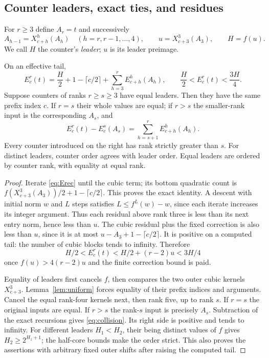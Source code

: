 \documentclass[11pt]{article}
\begin{document}
\subsection{Counter leaders, exact ties, and residues}
For $r\ge3$ define $A_r=t$ and successively
\[
 A_{h-1}=X^h_{c+h}(A_h)\quad(h=r,r-1,\ldots,4),\qquad
 u=X^3_{c+3}(A_3),\qquad H=f(u).
\]
We call $H$ the counter's \emph{leader}; $u$ is its leader preimage.

\begin{lemma}\label{lem:counter}
On an effective tail,
\begin{equation}\label{eq:counter-expand}
 E^r_c(t)=\frac H2+1-\lceil c/2\rceil
                  +\sum_{h=3}^r E^h_{c+h}(A_h),
 \qquad \frac H2<E^r_c(t)<\frac{3H}{4}.
\end{equation}
Suppose counters of ranks $r\ge s\ge3$ have equal leaders. Then they
have the same prefix index $c$. If $r=s$ their whole values are equal;
if $r>s$ the smaller-rank input is the corresponding $A_s$, and
\begin{equation}\label{eq:collision}
 E^r_c(t)-E^s_c(A_s)=\sum_{h=s+1}^r E^h_{c+h}(A_h).
\end{equation}
Every counter introduced on the right has rank strictly greater than $s$.
For distinct leaders, counter order agrees with leader order. Equal
leaders are ordered by counter rank, with equality at equal rank.
\end{lemma}
\begin{proof}
Iterate \eqref{eq:Erec} until the cubic term; its bottom quadratic count
is $f(X^3_{c+3}(A_3))/2+1-\lceil c/2\rceil$. This proves the exact
identity. A descent with initial norm $w$ and $L$ steps satisfies
$L\le f^L(w)-w$, since each iterate increases its integer argument.
Thus each residual above rank three is less than its next entry norm,
hence less than $u$. The cubic residual plus the fixed correction is also
less than $u$, since it is at most $u-A_3+1-\lceil c/2\rceil$.
It is positive on a computed tail: the number of cubic blocks tends to
infinity. Therefore
\[
 H/2<E^r_c(t)<H/2+(r-2)u<3H/4
\]
once $f(u)>4(r-2)u$ and the finite correction bound is paid.

Equality of leaders first cancels $f$, then compares the two outer cubic
kernels $X^3_{c+3}$. Lemma~\ref{lem:uniform} forces equality of their
prefix indices and arguments. Cancel the equal rank-four kernels next,
then rank five, up to rank $s$. If $r=s$ the original inputs are equal.
If $r>s$ the rank-$s$ input is precisely $A_s$. Subtraction of the exact
recursions gives \eqref{eq:collision}. Its right side is positive and tends
to infinity. For different leaders $H_1<H_2$, their being distinct values
of $f$ gives $H_2\ge2^{H_1+1}$; the half-core bounds make the order strict.
This also proves the assertions with arbitrary fixed outer shifts after
raising the computed tail.
\end{proof}
\end{document}
